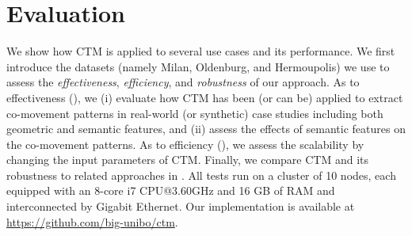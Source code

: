 \documentclass[
]{ceurart}
\renewcommand{\sf}[1]{\textsf{\textup{#1}}}
\newcommand{\mf}[1]{#1}
\begin{document}
\section{Evaluation}\label{sec:test}
We show how CTM is applied to several use cases and its performance.
We first introduce the datasets (namely \sf{Milan}, \sf{Oldenburg}, and \sf{Hermoupolis}) we use to assess the \mf{
\textit{effectiveness}, \textit{efficiency}, and \textit{robustness}
} of our approach.
As to effectiveness (), we (i) evaluate how CTM has been (or can be) applied to extract co-movement patterns in real-world (or synthetic) case studies including both geometric and semantic features, and (ii) assess the effects of semantic features on the co-movement patterns. %
As to efficiency (), we assess the scalability by changing the input parameters of CTM. 
Finally, we compare CTM \mf{and its robustness} to related approaches in .
All tests run on a cluster of 10 nodes, each equipped with an 8-core i7 CPU@3.60GHz and 16 GB of RAM and interconnected by Gigabit Ethernet.
Our implementation is available at \url{https://github.com/big-unibo/ctm}.
\end{document}
